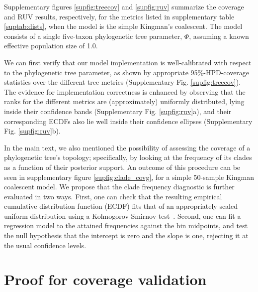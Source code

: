 \documentclass[oneside]{article}
\begin{document}
Supplementary figures \ref{supfig:treecov} and \ref{supfig:ruv} summarize the coverage and RUV results, respectively, for the metrics listed in supplementary table \ref{suptab:dists}, when the model is the simple Kingman's coalescent.
The model consists of a single five-taxon phylogenetic tree parameter, $\Phi$, assuming a known effective population size of 1.0.

We can first verify that our model implementation is well-calibrated with respect to the phylogenetic tree parameter, as shown by appropriate 95\%-HPD-coverage statistics over the different tree metrics (Supplementary Fig. \ref{supfig:treecov}).
The evidence for implementation correctness is enhanced by observing that the ranks for the different metrics are (approximately) uniformly distributed, lying inside their confidence bands (Supplementary Fig. \ref{supfig:ruv}a), and their corresponding ECDFs also lie well inside their confidence ellipses (Supplementary Fig. \ref{supfig:ruv}b).

In the main text, we also mentioned the possibility of assessing the coverage of a phylogenetic tree's topology; specifically, by looking at the frequency of its clades as a function of their posterior support.
An outcome of this procedure can be seen in supplementary figure \ref{supfig:clade_covg}, for a simple 50-sample Kingman coalescent model.
We propose that the clade frequency diagnostic is further evaluated in two ways.
First, one can check that the resulting empirical cumulative distribution function (ECDF) fits that of an appropriately scaled uniform distribution using a Kolmogorov-Smirnov test~\citep{Birnbaum1951}.
Second, one can fit a regression model to the attained frequencies against the bin midpoints, and test the null hypothesis that the intercept is zero and the slope is one, rejecting it at the usual confidence levels.

\newpage
\section{Proof for coverage validation}
 \label{appendix::sec:proofs}
\end{document}
